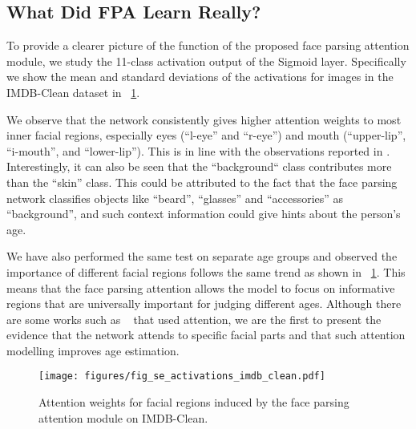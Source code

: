 \subsection{What Did FPA Learn Really?}\label{sec:FPA}
To provide a clearer picture of the function of the proposed face parsing attention module, we study the 11-class activation output of the Sigmoid layer. Specifically we show the mean and standard deviations of the activations for images in the IMDB-Clean dataset in \figurename~\ref{fig:se_act}. 

We observe that the network consistently gives higher attention weights to most inner facial regions, especially eyes (``l-eye'' and ``r-eye'') and mouth (``upper-lip'', ``i-mouth'', and ``lower-lip''). This is in line with the observations reported in \cite{hanDemographicEstimationFace2015}.
Interestingly, it can also be seen that the ``background`` class contributes more than the ``skin'' class. This could be attributed to the fact that the face parsing network classifies objects like ``beard'', ``glasses'' and ``accessories'' as ``background'', and such context information could give hints about the person's age.

We have also performed the same test on separate age groups and observed the importance of different facial regions follows the same trend as shown in \figurename~\ref{fig:se_act}. This means that the face parsing attention allows the model to focus on informative regions that are universally important for judging different ages.
Although there are some works such as ~\cite{yiAgeEstimationMultiscale2014,Angeloni_2019_ICCV, liao2017local, peiAttendedEndtoEndArchitecture2020}  that used attention, we are the first to present the evidence that the network attends to specific facial parts and that such attention modelling improves age estimation.

\begin{figure}
    \centering
    \texttt{[image: figures/fig\_se\_activations\_imdb\_clean.pdf]}
    \caption{Attention weights for facial regions induced by the face parsing attention module on IMDB-Clean.}
    \label{fig:se_act}
\end{figure}

